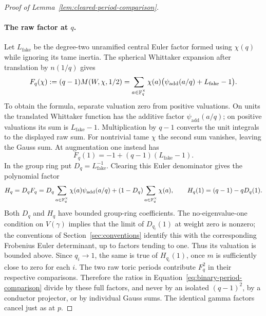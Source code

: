 \begin{proof}[Proof of Lemma~\ref{lem:cleared-period-comparison}]
\paragraph{The raw factor at $q$.}
Let $L_{\mathrm{fake}}$ be the degree-two unramified central Euler
factor formed using $\chi(q)$ while ignoring its tame inertia.  The
spherical Whittaker expansion after translation by $n(1/q)$ gives
\begin{equation}\label{eq:raw-q-factor}
 F_q(\chi):=(q-1)M(W,\chi,1/2)
 =\sum_{a\in\mathbb F_q^\times}\chi(a)
       \bigl(\psi_{\mathrm{add}}(a/q)+L_{\mathrm{fake}}-1\bigr).
\end{equation}
To obtain the formula, separate valuation zero from positive
valuations.  On units the translated Whittaker function has the
additive factor $\psi_{\mathrm{add}}(a/q)$; on positive valuations its
sum is $L_{\mathrm{fake}}-1$.  Multiplication by $q-1$ converts the
unit integrals to the displayed raw sum.  For nontrivial tame $\chi$
the second sum vanishes, leaving the Gauss sum.  At augmentation one
instead has
\[
 F_q(1)=-1+(q-1)(L_{\mathrm{fake}}-1).
\]
In the group ring put $D_q=L_{\mathrm{fake}}^{-1}$.  Clearing this
Euler denominator gives the polynomial factor
\begin{equation}\label{eq:cleared-q-factor}
 H_q=D_qF_q
   =D_q\sum_{a\in\mathbb F_q^\times}\chi(a)\psi_{\mathrm{add}}(a/q)
     +(1-D_q)\sum_{a\in\mathbb F_q^\times}\chi(a),
 \qquad H_q(1)=(q-1)-qD_q(1).
\end{equation}
Both $D_q$ and $H_q$ have bounded group-ring coefficients.  The
no-eigenvalue-one condition on $V(\gamma)$ implies that the limit of
$D_{q_i}(1)$ at weight zero is nonzero; the conventions of
Section~\ref{sec:conventions} identify this with the corresponding
Frobenius Euler determinant, up to factors tending to one.  Thus its
valuation is bounded above.  Since $q_i\to1$, the same is true of
$H_{q_i}(1)$, once $m$ is sufficiently close to zero for each $i$.
The two raw toric periods contribute $F_q^2$ in their respective
comparisons.  Therefore the ratios in
Equation~\ref{eq:binary-period-comparison} divide by these full factors,
and never by an isolated $(q-1)^2$, by a conductor projector, or by
individual Gauss sums.  The identical gamma factors cancel just as at
$p$.


\end{proof}
